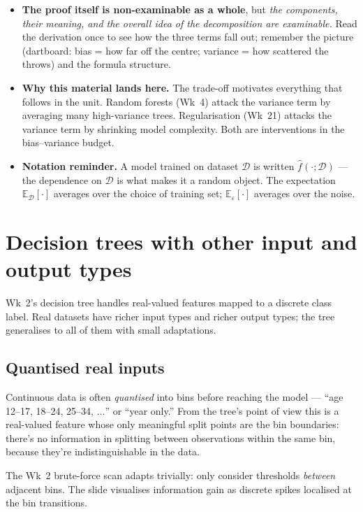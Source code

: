 \documentclass[11pt, a4paper]{article}
\begin{document}
\begin{tldrbox}
\begin{itemize}[leftmargin=*]
  \item \textbf{The proof itself is non-examinable as a whole}, but \emph{the components, their meaning, and the overall idea of the decomposition are examinable.} Read the derivation once to see how the three terms fall out; remember the picture (dartboard: bias = how far off the centre; variance = how scattered the throws) and the formula structure.
  \item \textbf{Why this material lands here.} The trade-off motivates everything that follows in the unit. Random forests (Wk~4) attack the variance term by averaging many high-variance trees. Regularisation (Wk~21) attacks the variance term by shrinking model complexity. Both are interventions in the bias--variance budget.
  \item \textbf{Notation reminder.} A model trained on dataset $\mathcal{D}$ is written $\hat{f}(\cdot;\mathcal{D})$ — the dependence on $\mathcal{D}$ is what makes it a random object. The expectation $\mathbb{E}_{\mathcal{D}}[\cdot]$ averages over the choice of training set; $\mathbb{E}_{\varepsilon}[\cdot]$ averages over the noise.
\end{itemize}
\end{tldrbox}

\section{Decision trees with other input and output types}

Wk~2's decision tree handles real-valued features mapped to a discrete class label. Real datasets have richer input types and richer output types; the tree generalises to all of them with small adaptations.

\subsection{Quantised real inputs}

Continuous data is often \emph{quantised} into bins before reaching the model — ``age 12--17, 18--24, 25--34, $\ldots$'' or ``year only.'' From the tree's point of view this is a real-valued feature whose only meaningful split points are the bin boundaries: there's no information in splitting between observations within the same bin, because they're indistinguishable in the data.

The Wk~2 brute-force scan adapts trivially: only consider thresholds \emph{between} adjacent bins. The slide visualises information gain as discrete spikes localised at the bin transitions.
\end{document}
